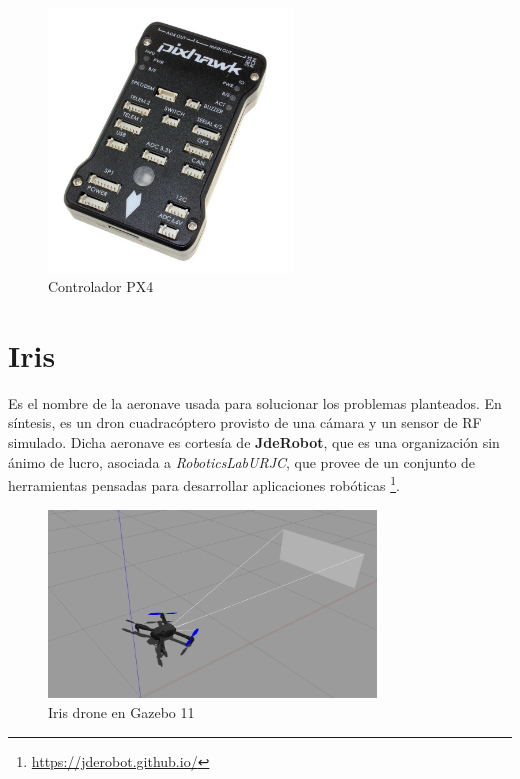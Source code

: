 \begin{figure} [H]
	\begin{center}
	\includegraphics[height=7cm]{imagenes/cap3/7_px4_logo.png}
	\end{center}
	\caption[Controlador PX4]{Controlador PX4}
	\label{fig:px4autopilot}
\end{figure}

\section{Iris}
\label{sec:iris}

Es el nombre de la aeronave usada para solucionar los problemas planteados. En síntesis, es un dron cuadracóptero provisto de una cámara y un sensor de \ac{RF} simulado. Dicha aeronave es cortesía de \textbf{JdeRobot}, que es una organización sin ánimo de lucro, asociada a \emph{RoboticsLabURJC}, que provee de un conjunto de herramientas pensadas para desarrollar aplicaciones robóticas \footnote[16]{\url{https://jderobot.github.io/}}.\\

\begin{figure} [H]
	\begin{center}
	\includegraphics[height=5cm]{imagenes/cap3/8_iris_drone.png}
	\end{center}
	\caption[Iris drone en Gazebo 11]{Iris drone en Gazebo 11}
	\label{fig:irisdrone}
\end{figure}